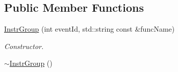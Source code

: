 \subsection*{Public Member Functions}
\begin{DoxyCompactItemize}
\item 
\hypertarget{class_instr_group_a5e42e6a1eee81a9b67852cf9cba38703}{\hyperlink{class_instr_group_a5e42e6a1eee81a9b67852cf9cba38703}{Instr\-Group} (int event\-Id, std\-::string const \&func\-Name)}\label{class_instr_group_a5e42e6a1eee81a9b67852cf9cba38703}

\begin{DoxyCompactList}\small\item\em Constructor. \end{DoxyCompactList}\item 
\hypertarget{class_instr_group_a0a3d7f4dc0c35b8f254ff19badec2d3a}{\hyperlink{class_instr_group_a0a3d7f4dc0c35b8f254ff19badec2d3a}{$\sim$\-Instr\-Group} ()}\label{class_instr_group_a0a3d7f4dc0c35b8f254ff19badec2d3a}


\end{DoxyCompactItemize}
